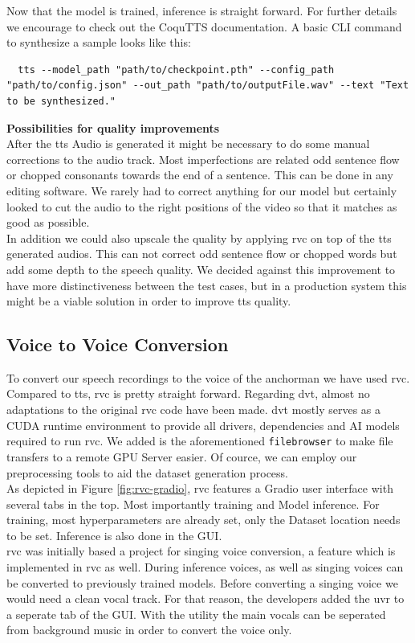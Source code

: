 \documentclass[
  a4paper,  %
  twoside,  %
  bibliography=totoc,
  headsepline,
  cleardoublepage=empty,
  parskip=half,
  draft=false
]{scrbook}
\begin{document}
Now that the model is trained, inference is straight forward. For further details we encourage to check out the CoquTTS documentation. A basic CLI command to synthesize a sample looks like this:
\begin{lstlisting}
  tts --model_path "path/to/checkpoint.pth" --config_path "path/to/config.json" --out_path "path/to/outputFile.wav" --text "Text to be synthesized."
\end{lstlisting}

\textbf{Possibilities for quality improvements} \\
After the \gls{tts} Audio is generated it might be necessary to do some manual corrections to the audio track. Most imperfections are related odd sentence flow or chopped consonants towards the end of a sentence. This can be done in any editing software. We rarely had to correct anything for our model but certainly looked to cut the audio to the right positions of the video so that it matches as good as possible. \\
In addition we could also upscale the quality by applying \gls{rvc} on top of the \gls{tts} generated audios. This can not correct odd sentence flow or chopped words but add some depth to the speech quality. We decided against this improvement to have more distinctiveness between the test cases, but in a production system this might be a viable solution in order to improve \gls{tts} quality. 

\subsection{Voice to Voice Conversion}
To convert our speech recordings to the voice of the anchorman we have used \gls{rvc}. Compared to \gls{tts}, \gls{rvc} is pretty straight forward. Regarding \gls*{dvt}, almost no adaptations to the original \gls*{rvc} \cite*{RVCProjectRetrievalbasedVoiceConversionWebUI2023} code have been made. \gls*{dvt} mostly serves as a CUDA runtime environment to provide all drivers, dependencies and AI models required to run \gls{rvc}. We added is the aforementioned \verb|filebrowser| to make file transfers to a remote GPU Server easier. Of cource, we can employ our preprocessing tools to aid the dataset generation process.\\
As depicted in Figure \ref{fig:rvc-gradio}, \gls{rvc} features a Gradio user interface with several tabs in the top. Most importantly training and Model inference. For training, most hyperparameters are already set, only the Dataset location needs to be set. Inference is also done in the GUI. \\
\gls{rvc} was initially based a project for singing voice conversion, a feature which is implemented in \gls{rvc} as well. During inference voices, as well as singing voices can be converted to previously trained models. Before converting a singing voice we would need a clean vocal track. For that reason, the developers added the \gls{uvr} to a seperate tab of the GUI. With the utility the main vocals can be seperated from background music in order to convert the voice only.
\end{document}
